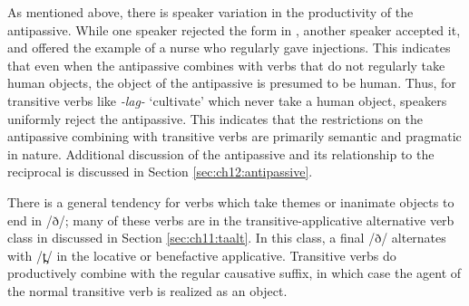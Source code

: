 As mentioned above, there is speaker variation in the productivity of the antipassive. While one speaker rejected the form in , another speaker accepted it, and offered the example of a nurse who regularly gave injections. This indicates that even when the antipassive combines with verbs that do not regularly take human objects, the object of the antipassive is presumed to be human. Thus, for transitive verbs like \textit{-lag-} `cultivate' which never take a human object, speakers uniformly reject the antipassive. This indicates that the restrictions on the antipassive combining with transitive verbs are primarily semantic and pragmatic in nature. Additional discussion of the antipassive and its relationship to the reciprocal is discussed in Section \ref{sec:ch12:antipassive}. 

There is a general tendency for verbs which take themes or inanimate objects to end in /ð/; many of these verbs are in the transitive-applicative alternative verb class in discussed in Section \ref{sec:ch11:taalt}. In this class, a final /ð/ alternates with /t̪/ in the locative or benefactive applicative.  Transitive verbs do productively combine with the regular causative suffix, in which case the agent of the normal transitive verb is realized as an object.

 





%




